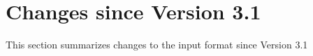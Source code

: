 
\section{Changes since Version 3.1}
This section summarizes changes to the \tahoe input format
since Version 3.1
